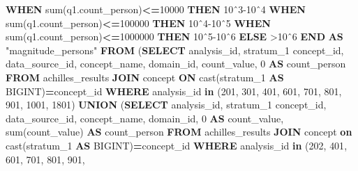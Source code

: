 \documentclass[
]{book}
\newenvironment{Shaded}{\begin{snugshade}}{\end{snugshade}}
\newcommand{\ControlFlowTok}[1]{\textcolor[rgb]{0.13,0.29,0.53}{\textbf{#1}}}
\newcommand{\DecValTok}[1]{\textcolor[rgb]{0.00,0.00,0.81}{#1}}
\newcommand{\FunctionTok}[1]{\textcolor[rgb]{0.00,0.00,0.00}{#1}}
\newcommand{\KeywordTok}[1]{\textcolor[rgb]{0.13,0.29,0.53}{\textbf{#1}}}
\newcommand{\NormalTok}[1]{#1}
\newcommand{\OperatorTok}[1]{\textcolor[rgb]{0.81,0.36,0.00}{\textbf{#1}}}
\newcommand{\OtherTok}[1]{\textcolor[rgb]{0.56,0.35,0.01}{#1}}
\newcommand{\StringTok}[1]{\textcolor[rgb]{0.31,0.60,0.02}{#1}}
\begin{document}
\begin{Shaded}
\begin{Highlighting}[]
        \ControlFlowTok{WHEN} \FunctionTok{sum}\NormalTok{(q1.count\_person)}\OperatorTok{\textless{}=}\DecValTok{10000} \ControlFlowTok{THEN} \StringTok{\textquotesingle{}10ˆ3{-}10ˆ4\textquotesingle{}}
        \ControlFlowTok{WHEN} \FunctionTok{sum}\NormalTok{(q1.count\_person)}\OperatorTok{\textless{}=}\DecValTok{100000} \ControlFlowTok{THEN} \StringTok{\textquotesingle{}10ˆ4{-}10ˆ5\textquotesingle{}}
        \ControlFlowTok{WHEN} \FunctionTok{sum}\NormalTok{(q1.count\_person)}\OperatorTok{\textless{}=}\DecValTok{1000000} \ControlFlowTok{THEN} \StringTok{\textquotesingle{}10ˆ5{-}10ˆ6\textquotesingle{}}
        \ControlFlowTok{ELSE} \StringTok{\textquotesingle{}\textgreater{}10ˆ6\textquotesingle{}}
    \ControlFlowTok{END} \KeywordTok{AS} \OtherTok{"magnitude\_persons"}
\KeywordTok{FROM}\NormalTok{ (}\KeywordTok{SELECT}\NormalTok{ analysis\_id,}
\NormalTok{             stratum\_1 concept\_id,}
\NormalTok{             data\_source\_id,}
\NormalTok{             concept\_name,}
\NormalTok{             domain\_id,}
\NormalTok{             count\_value, }\DecValTok{0} \KeywordTok{AS}\NormalTok{ count\_person}
    \KeywordTok{FROM}\NormalTok{ achilles\_results}
    \KeywordTok{JOIN}\NormalTok{ concept }\KeywordTok{ON} \FunctionTok{cast}\NormalTok{(stratum\_1 }\KeywordTok{AS}\NormalTok{ BIGINT)}\OperatorTok{=}\NormalTok{concept\_id}
    \KeywordTok{WHERE}\NormalTok{ analysis\_id }\KeywordTok{in}\NormalTok{ (}\DecValTok{201}\NormalTok{, }\DecValTok{301}\NormalTok{, }\DecValTok{401}\NormalTok{, }\DecValTok{601}\NormalTok{, }\DecValTok{701}\NormalTok{, }\DecValTok{801}\NormalTok{, }\DecValTok{901}\NormalTok{, }\DecValTok{1001}\NormalTok{, }
        \DecValTok{1801}\NormalTok{)}
    \KeywordTok{UNION}\NormalTok{ (}\KeywordTok{SELECT}\NormalTok{  analysis\_id,}
\NormalTok{                   stratum\_1 concept\_id,}
\NormalTok{                   data\_source\_id,}
\NormalTok{                   concept\_name,}
\NormalTok{                   domain\_id,}
                   \DecValTok{0} \KeywordTok{AS}\NormalTok{ count\_value,}
                   \FunctionTok{sum}\NormalTok{(count\_value) }\KeywordTok{AS}\NormalTok{ count\_person}
            \KeywordTok{FROM}\NormalTok{  achilles\_results}
            \KeywordTok{JOIN}\NormalTok{ concept }\KeywordTok{on} \FunctionTok{cast}\NormalTok{(stratum\_1 }\KeywordTok{AS}\NormalTok{ BIGINT)}\OperatorTok{=}\NormalTok{concept\_id}
            \KeywordTok{WHERE}\NormalTok{ analysis\_id }\KeywordTok{in}\NormalTok{ (}\DecValTok{202}\NormalTok{, }\DecValTok{401}\NormalTok{, }\DecValTok{601}\NormalTok{, }\DecValTok{701}\NormalTok{, }\DecValTok{801}\NormalTok{, }\DecValTok{901}\NormalTok{, }

\end{Highlighting}
\end{Shaded}
\end{document}
